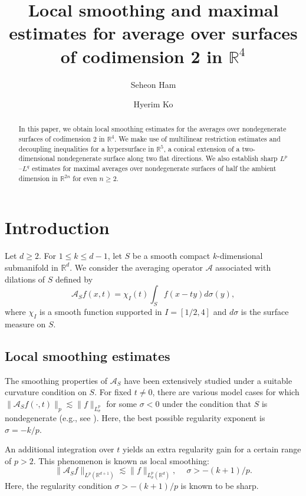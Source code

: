 \documentclass[10pt] %
{amsart}
\title[]
{Local smoothing and maximal estimates for average over surfaces of codimension 2 in $\mathbb R^4$}
\author{Seheon Ham} \author{Hyerim Ko}
\theoremstyle{plain}
\numberwithin{equation}{section}
\begin{document}
\begin{abstract} 
In this paper, we obtain local smoothing  
estimates for the averages over nondegenerate surfaces of codimension $2$ in $\mathbb R^4$. 
We make use of multilinear restriction estimates and decoupling inequalities for a hypersurface in $\mathbb R^5$, a conical extension of a two-dimensional nondegenerate surface along two flat directions. 
We also establish sharp $L^p$--$L^q$ estimates for maximal averages over nondegenerate surfaces of half the ambient dimension in $\mathbb R^{2n}$ for even $n \ge 2$.  
\end{abstract}
 
 
 
\maketitle


\section{Introduction}
Let $d \ge 2$. For $1 \le k \le d-1$, let $S$ be a smooth compact $k$-dimensional submanifold in $\mathbb R^d$.
We consider the averaging operator $\mathcal A$ associated with dilations of $S$ defined by  
\begin{equation*} 
\mathcal   A_S f (x, t )  = \chi_I(t)  \int_{S} f(x - t y) d\sigma(y)  ,
\end{equation*}
where $\chi_I$ is a smooth function supported in $I = [1/2,4]$ and $d\sigma$ is the surface measure on $S$. 

\subsection*{Local smoothing estimates}
The smoothing properties of $\mathcal A_S$ have been extensively studied under a suitable curvature condition on $S$.
For fixed $t \neq 0$, there are various model 
cases for which $\| \mathcal A_S f(\cdot,t)\|_{p} \lesssim \|f\|_{L_\sigma^p}$ for some  $\sigma<0$ under the condition that $S$ is nondegenerate (e.g., see  \cite{Pe, M, SSS, OSS, PS2, BGHS2, KLO23}). 
Here, the best possible  regularity exponent is $\sigma=-k/p$.  
 

An additional integration over $t$ yields an extra regularity gain for a certain range of $p>2$. This phenomenon is  known as  local smoothing:  
\begin{equation}\label{submanifold}
\| \mathcal A_S f \|_{L^p (\mathbb R^{d+1})} \lesssim \|f\|_{L^p_\sigma(\mathbb R^d)}, ~\quad \sigma > - (k+1)/p   .
\end{equation} 
Here, the regularity condition $\sigma > - (k+1)/p$ is known to be sharp. 
\end{document}
